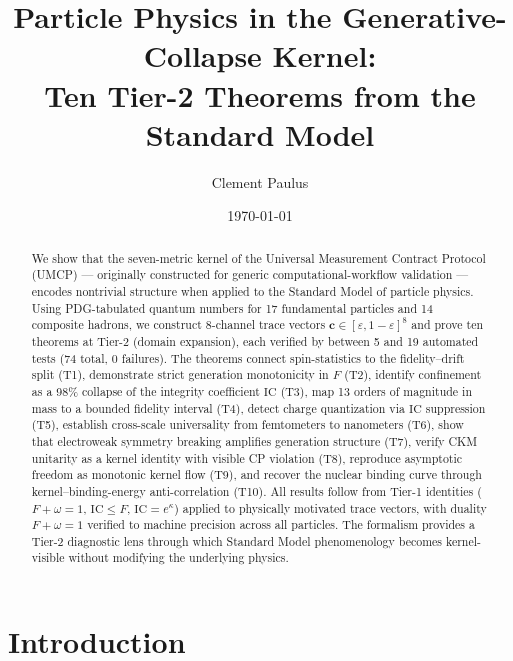 \documentclass[
  aps,
  prd,
  twocolumn,
  superscriptaddress,
  nofootinbib,
  floatfix
]{revtex4-2}
\newcommand{\eps}{\varepsilon}
\newcommand{\tvec}{\mathbf{c}}
\newcommand{\IC}{\mathrm{IC}}
\begin{document}
\title{Particle Physics in the Generative-Collapse Kernel:\\
Ten Tier-2 Theorems from the Standard Model}

\author{Clement Paulus}

\date{\today}

\begin{abstract}
We show that the seven-metric kernel of the Universal Measurement
Contract Protocol (UMCP) --- originally constructed for generic
computational-workflow validation --- encodes nontrivial structure
when applied to the Standard Model of particle physics.
Using PDG-tabulated quantum numbers for 17 fundamental particles
and 14 composite hadrons, we construct 8-channel trace vectors
$\tvec \in [\eps, 1-\eps]^8$ and prove ten theorems at Tier-2
(domain expansion), each verified by between 5 and 19 automated
tests (74 total, 0 failures).  The theorems connect spin-statistics
to the fidelity--drift split (T1), demonstrate strict generation
monotonicity in $F$ (T2), identify confinement as a 98\% collapse
of the integrity coefficient $\IC$ (T3), map 13 orders of magnitude
in mass to a bounded fidelity interval (T4), detect charge
quantization via $\IC$ suppression (T5), establish cross-scale
universality from femtometers to nanometers (T6), show that
electroweak symmetry breaking amplifies generation structure (T7),
verify CKM unitarity as a kernel identity with visible CP violation
(T8), reproduce asymptotic freedom as monotonic kernel flow (T9),
and recover the nuclear binding curve through kernel--binding-energy
anti-correlation (T10).  All results follow from Tier-1 identities
($F + \omega = 1$, $\IC \leq F$, $\IC = e^{\kappa}$) applied to
physically motivated trace vectors, with duality $F + \omega = 1$
verified to machine precision across all particles.
The formalism provides a Tier-2 diagnostic lens through which
Standard Model phenomenology becomes kernel-visible without
modifying the underlying physics.
\end{abstract}

\maketitle

\section{Introduction}\label{sec:intro}
\end{document}
